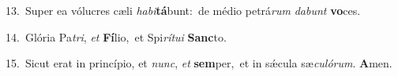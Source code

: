 {\numbfont\textcolor{\numbcolor}{13.}}~Super ea vólucres cæli \textit{ha}\-\textit{bi}\textbf{tá}bunt:~\star de médio petrá\textit{rum} \textit{da}\-\textit{bunt} \textbf{vo}\-ces.\par
{\numbfont\textcolor{\numbcolor}{14.}}~Glória Pa\-\textit{tri}\-, \textit{et} \textbf{Fí}\-lio,~\star et Spi\-\textit{rí}\-\textit{tu}\textit{i} \textbf{Sanc}\-to.\par
{\numbfont\textcolor{\numbcolor}{15.}}~Sicut erat in princípio, et \textit{nunc}\-, \textit{et} \textbf{sem}\-per,~\star et in sǽcula sæ\-\textit{cu}\-\textit{ló}\textit{rum}. \textbf{A}\-men.\par
